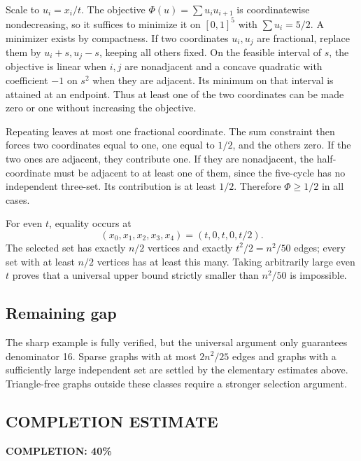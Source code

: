 Scale to $u_i=x_i/t$. The objective $\Phi(u)=\sum u_i u_{i+1}$ is coordinatewise nondecreasing, so it suffices to minimize it on $[0,1]^5$ with $\sum u_i=5/2$. A minimizer exists by compactness. If two coordinates $u_i,u_j$ are fractional, replace them by $u_i+s,u_j-s$, keeping all others fixed. On the feasible interval of $s$, the objective is linear when $i,j$ are nonadjacent and a concave quadratic with coefficient $-1$ on $s^2$ when they are adjacent. Its minimum on that interval is attained at an endpoint. Thus at least one of the two coordinates can be made zero or one without increasing the objective.

Repeating leaves at most one fractional coordinate. The sum constraint then forces two coordinates equal to one, one equal to $1/2$, and the others zero. If the two ones are adjacent, they contribute one. If they are nonadjacent, the half-coordinate must be adjacent to at least one of them, since the five-cycle has no independent three-set. Its contribution is at least $1/2$. Therefore $\Phi\ge1/2$ in all cases.

For even $t$, equality occurs at
\[
 (x_0,x_1,x_2,x_3,x_4)=(t,0,t,0,t/2).
\]
The selected set has exactly $n/2$ vertices and exactly
$t^2/2=n^2/50$ edges; every set with at least $n/2$ vertices has at least this many. Taking arbitrarily large even $t$ proves that a universal upper bound strictly smaller than $n^2/50$ is impossible.

\subsection*{Remaining gap}
The sharp example is fully verified, but the universal argument only guarantees denominator 16. Sparse graphs with at most $2n^2/25$ edges and graphs with a sufficiently large independent set are settled by the elementary estimates above. Triangle-free graphs outside these classes require a stronger selection argument.
\subsection*{COMPLETION ESTIMATE}
\textbf{COMPLETION: 40\%}
